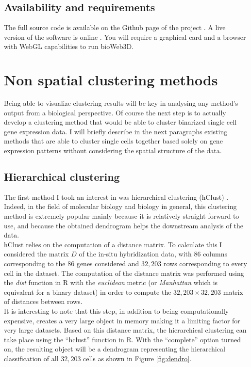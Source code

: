 	\subsection{Availability and requirements}
The full source code is available on the Github page of the project \citep{github}. A live version of the software is online \citep{bioWeb3D}. You will require a graphical card and a browser with WebGL capabilities to run bioWeb3D.

\section{Non spatial clustering methods}
Being able to visualize clustering results will be key in analysing any method's output from a biological perspective. Of course the next step is to actually develop a clustering method that would be able to cluster binarized single cell gene expression data. I will briefly describe in the next paragraphs existing methods that are able to cluster single cells together based solely on gene expression patterns without considering the spatial structure of the data.
	\subsection{Hierarchical clustering}
	The first method I took an interest in was hierarchical clustering (hClust) \citep{johnson67}. Indeed, in the field of molecular biology and biology in general, this clustering method is extremely popular mainly because it is relatively straight forward to use, and because the obtained dendrogram helps the downstream analysis of the data.\\
	
	hClust relies on the computation of a distance matrix. To calculate this I considered the matrix $D$ of the in-situ hybridization data, with $86$ columns corresponding to the 86 genes considered and $32,203$ rows corresponding to every cell in the dataset. The computation of the distance matrix was performed using the \emph{dist} function in R with the \emph{euclidean} metric (or \emph{Manhattan} which is equivalent for a binary dataset) in order to compute the $32,203 \times 32,203$ matrix of distances between rows.\\
	
	It is interesting to note that this step, in addition to being computationally expensive, creates a very large object in memory making it a limiting factor for very large datasets. Based on this distance matrix, the hierarchical clustering can take place using the ``hclust'' function in R. With the ``complete'' option turned on, the resulting object will be a dendrogram  representing the hierarchical classification of all $32,203$ cells as shown in Figure \ref{fig:dendro}.\\
	
